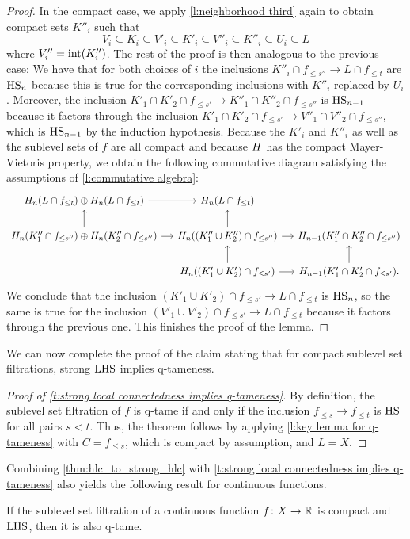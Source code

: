 \begin{proof}
	In the compact case, we apply \cref{l:neighborhood third} again to obtain compact sets $K''_i$ such that
	\[V_i \subseteq K_i \subseteq V'_i \subseteq K'_i \subseteq V''_i \subseteq K''_i \subseteq U_i \subseteq L\]
	where $V''_i = \operatorname{int}(K''_i)$. The rest of the proof is then analogous to the previous case:
	We have that for both choices of $i$ the inclusions
	$K''_i \cap f_{\leq s''} \to L \cap f_{\leq t}$
	are $\mathrm{HS}_n$ because this is true for the corresponding inclusions with $K''_i$ replaced by $U_i$.
	Moreover, the inclusion
	$K'_1 \cap K'_2 \cap f_{\leq s'} \to K''_1 \cap K''_2 \cap f_{\leq s''}$
	is $\mathrm{HS}_{n-1}$ because it factors through the inclusion
	$K'_1 \cap K'_2 \cap f_{\leq s'} \to V''_1 \cap V''_2 \cap f_{\leq s''}$,
	which is $\mathrm{HS}_{n-1}$ by the induction hypothesis.
	Because the $K'_i$ and $K''_i$ as well as the sublevel sets of $f$ are all compact and because $H$ has the compact Mayer-Vietoris property, we obtain the following commutative diagram satisfying the assumptions of \cref{l:commutative algebra}:
	\[
	\begin{tikzcd}[column sep=small]
	\H_n(L \cap f_{\leq t}) \oplus \H_n(L \cap f_{\leq t}) \arrow[r] &
	\H_n(L \cap f_{\leq t}) & \\
	\H_{n}(K''_1 \cap f_{\leq s''}) \oplus \H_n(K''_2 \cap f_{\leq s''}) \arrow[r] \arrow[u] & 
	\H_{n}((K''_1 \cup K''_2) \cap f_{\leq s''}) \arrow[r] \arrow[u] &
	\H_{n-1}(K''_1 \cap K''_2 \cap f_{\leq s''}) \\ & 
	\H_{n}((K'_1 \cup K'_2) \cap f_{\leq s'}) \arrow[r] \arrow[u] &
	\H_{n-1}(K'_1 \cap K'_2 \cap f_{\leq s'}). \arrow[u]
	\end{tikzcd}
	\]
	We conclude that the inclusion 
	$\left(K'_1 \cup K'_2 \right) \cap f_{\leq s'} \to L \cap f_{\leq t}$
	is $\mathrm{HS}_n$, so the same is true for the inclusion
	$\left(V'_1 \cup V'_2 \right) \cap f_{\leq s'} \to L \cap f_{\leq t}$ 
	because it factors through the previous one. This finishes the proof of the lemma.
\end{proof}

We can now complete the proof of the claim stating that for compact sublevel set filtrations, strong $\mathrm{LHS}$ implies q-tameness. 

\begin{proof}[Proof of \cref{t:strong local connectedness implies q-tameness}]
    By definition, the sublevel set filtration of $f$ is q-tame if and only if the inclusion $f_{\leq s} \to f_{\leq t}$ is $\mathrm{HS}$ for all pairs $s < t$.
    Thus, the theorem follows by applying \cref{l:key lemma for q-tameness} with $C = f_{\leq s}$, which is compact by assumption, and $L = X$.
\end{proof}

Combining \cref{thm:hlc_to_strong_hlc} with \cref{t:strong local connectedness implies q-tameness} also yields the following result for continuous functions.

\begin{cor}
    If the sublevel set filtration of a continuous function $f \colon X \to \mathbb{R}$ is compact and $\mathrm{LHS}$, then it is also q-tame.
\end{cor}


